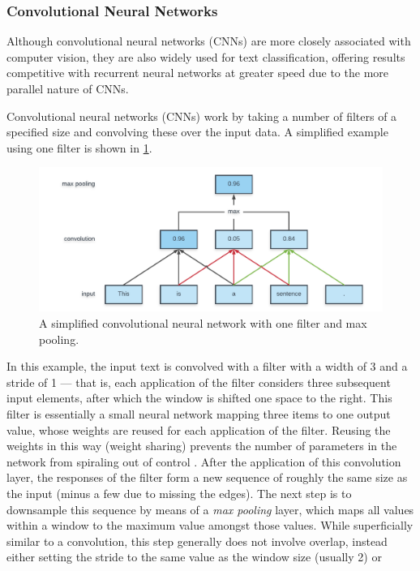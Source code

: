 \subsubsection{Convolutional Neural Networks}\label{sec:conv}
Although convolutional neural networks (CNNs) are more closely associated with
computer vision, they are also widely used for text classification, offering
results competitive with recurrent neural networks\citep{cnnrnn} at greater
speed due to the more parallel nature of CNNs\citep{facebook}.

Convolutional neural networks (CNNs) work by taking a number of filters  of a
specified size and convolving these over the input data. A simplified example
using one filter is shown in \cref{fig:cnn}.
\begin{figure}[tb]
  \centering
  \includegraphics[width=\textwidth]{figures/cnn.pdf}
  \caption{A simplified convolutional neural network with one filter and
  max pooling.\label{fig:cnn}}
\end{figure}
In this example, the input text is convolved with a filter with a width of 3 and
a stride of 1 --- that is, each application of the filter considers three
subsequent input elements, after which the window is shifted one space to the
right. This filter is essentially a small neural network mapping three items to
one output value, whose weights are reused for each application of the filter.
Reusing the weights in this way (weight sharing) prevents the number of
parameters in the network from spiraling out of control
\citep{lecun1995convolutional}. After the application of this convolution layer,
the responses of the filter form a new sequence of roughly the same size as the
input (minus a few due to missing the edges). The next step is to downsample
this sequence by means of a \emph{max pooling} layer, which maps all values
within a window to the maximum value amongst those values. While superficially
similar to a convolution, this step generally does not involve overlap, instead
either setting the stride to the same value as the window size (usually 2) or
